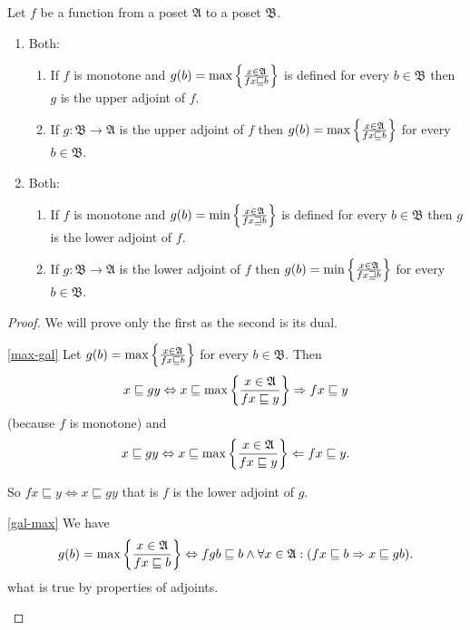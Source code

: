 \begin{thm}
Let $f$ be a function from a poset $\mathfrak{A}$ to a poset $\mathfrak{B}$.
\begin{enumerate}
\item Both:

\begin{enumerate}
\item \label{max-gal}If $f$ is monotone and $g(b)=\max\left\{ \frac{x\in\mathfrak{A}}{fx\sqsubseteq b}\right\}$
is defined for every $b\in\mathfrak{B}$ then $g$ is the upper adjoint
of $f$.
\item \label{gal-max}If $g:\mathfrak{B}\rightarrow\mathfrak{A}$ is the
upper adjoint of $f$ then $g(b)=\max\left\{ \frac{x\in\mathfrak{A}}{fx\sqsubseteq b}\right\}$
for every $b\in\mathfrak{B}$.
\end{enumerate}
\item Both:

\begin{enumerate}
\item If $f$ is monotone and $g(b)=\min\left\{ \frac{x\in\mathfrak{A}}{fx\sqsupseteq b}\right\}$
is defined for every $b\in\mathfrak{B}$ then $g$ is the lower adjoint
of $f$.
\item If $g:\mathfrak{B}\rightarrow\mathfrak{A}$ is the lower adjoint of
$f$ then $g(b)=\min\left\{ \frac{x\in\mathfrak{A}}{fx\sqsupseteq b}\right\}$
for every $b\in\mathfrak{B}$.
\end{enumerate}
\end{enumerate}
\end{thm}
\begin{proof}
We will prove only the first as the second is its dual.
\begin{widedisorder}
\item [{\ref{max-gal}}] Let $g(b)=\max\left\{ \frac{x\in\mathfrak{A}}{fx\sqsubseteq b}\right\}$
for every $b\in\mathfrak{B}$. Then
\[
x\sqsubseteq gy\Leftrightarrow x\sqsubseteq\max\left\{ \frac{x\in\mathfrak{A}}{fx\sqsubseteq y}\right\}\Rightarrow fx\sqsubseteq y
\]
(because $f$ is monotone) and
\[
x\sqsubseteq gy\Leftrightarrow x\sqsubseteq\max\left\{ \frac{x\in\mathfrak{A}}{fx\sqsubseteq y}\right\}\Leftarrow fx\sqsubseteq y.
\]



So $fx\sqsubseteq y\Leftrightarrow x\sqsubseteq gy$ that is $f$
is the lower adjoint of $g$.

\item [{\ref{gal-max}}] We have
\[
g(b)=\max\left\{ \frac{x\in\mathfrak{A}}{fx\sqsubseteq b}\right\}\Leftrightarrow fgb\sqsubseteq b\land\forall x\in\mathfrak{A}:(fx\sqsubseteq b\Rightarrow x\sqsubseteq gb).
\]
what is true by properties of adjoints.
\end{widedisorder}
\end{proof}
